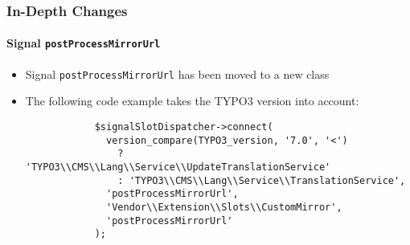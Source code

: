 \begin{frame}[fragile]
	\frametitle{In-Depth Changes}
	\framesubtitle{Signal \texttt{postProcessMirrorUrl}}

	\lstset{basicstyle=\tiny\ttfamily}

	\begin{itemize}

		\item Signal \texttt{postProcessMirrorUrl} has been moved to a new class

		\breakingchange

		\item The following code example takes the TYPO3 version into account:

		\begin{lstlisting}
			$signalSlotDispatcher->connect(
			  version_compare(TYPO3_version, '7.0', '<')
			    ? 'TYPO3\\CMS\\Lang\\Service\\UpdateTranslationService'
			    : 'TYPO3\\CMS\\Lang\\Service\\TranslationService',
			  'postProcessMirrorUrl',
			  'Vendor\\Extension\\Slots\\CustomMirror',
			  'postProcessMirrorUrl'
			);
		\end{lstlisting}

	\end{itemize}

\end{frame}


